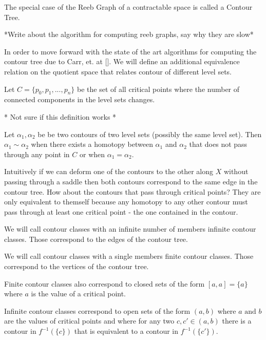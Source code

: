 The special case of the Reeb Graph of a contractable space is called a Contour Tree. 

*Write about the algorithm for computing reeb graphs, say why they are slow*

In order to move forward with the state of the art algorithms for computing the contour tree due to Carr, et. at []. We will define an additional equivalence relation on the quotient space that relates contour of different level sets.


\begin{defn}  Let $C = \{p_0, p_1, ..., p_n\}$ be the set of all critical points where the number of connected components in the level sets changes. \end{defn}

* Not sure if this definition works *

\begin{defn}   
    Let $\alpha_1, \alpha_2$ be be two contours of two level sets (possibly the same level set). Then $\alpha_1 \sim \alpha_2$ when there exists a homotopy between $\alpha_1$ and $\alpha_2$ that does not pass through any point in $C$ or when $\alpha_1 = \alpha_2$.
\end{defn}


Intuitively if we can deform one of the contours to the other along $X$ without passing through a saddle then both contours correspond to the same edge in the contour tree. How about the contours that pass through critical points? They are only equivalent to themself because any homotopy to any other contour must pass through at least one critical point - the one contained in the contour.


\begin{defn} We will call contour classes with an infinite number of members infinite contour classes. Those correspond to the edges of the contour tree.  \end{defn}

\begin{defn} We will call contour classes with a single members finite contour classes. Those correspond to the vertices of the contour tree.  \end{defn}

Finite contour classes also correspond to closed sets of the form $[a, a] = \{a\}$ where $a$ is the value of a critical point.

Infinite contour classes correspond to open sets of the form $(a, b)$ where $a \text{ and } b$ are the values of critical points and where for any two $c, c' \in (a, b)$ there is a contour in $f^{-1}(\{c\})$ that is equivalent to a contour in $f^{-1}(\{c'\})$.

